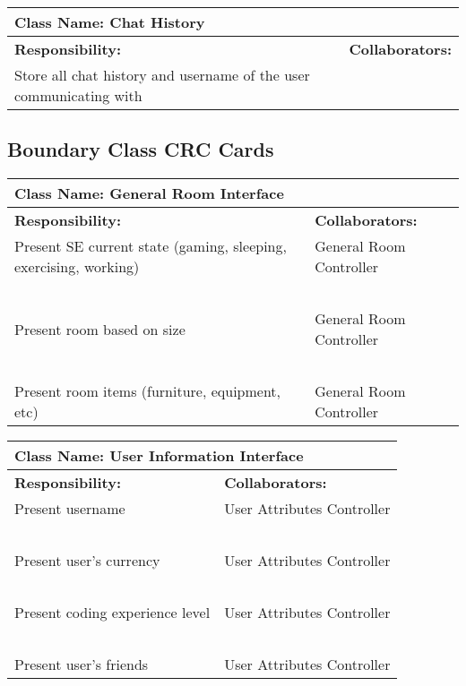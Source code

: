 \documentclass[]{article}
\begin{document}
\begin{table}[H]
    \centering
    \begin{tabular}{|p{7.5cm}|p{7.5cm}|}
        \hline
        \multicolumn{2}{|l|}{\textbf{Class Name:} Chat History}\\
        \hline
        \textbf{Responsibility:} & \textbf{Collaborators:}\\
        \hline
        Store all chat history and username of the user communicating with  & ~\\
        \hline
    \end{tabular}
\end{table}

\subsection{Boundary Class CRC Cards}
\label{sec:boundary_class_CRC_cards}

\begin{table}[H]
    \centering
    \begin{tabular}{|p{7.5cm}|p{7.5cm}|}
        \hline
        \multicolumn{2}{|l|}{\textbf{Class Name:} General Room Interface}\\
        \hline
        \textbf{Responsibility:} & \textbf{Collaborators:}\\
        \hline
        Present SE current state (gaming, sleeping, exercising, working) & General Room Controller\\
        ~ & ~\\
        Present room based on size & General Room Controller\\
        ~ & ~\\
        Present room items (furniture, equipment, etc) & General Room Controller\\
        \hline
    \end{tabular}
\end{table}

\begin{table}[H]
    \centering
    \begin{tabular}{|p{7.5cm}|p{7.5cm}|}
        \hline
        \multicolumn{2}{|l|}{\textbf{Class Name:} User Information Interface}\\
        \hline
        \textbf{Responsibility:} & \textbf{Collaborators:}\\
        \hline
        Present username & User Attributes Controller\\
        ~ & ~\\
        Present user’s currency & User Attributes Controller\\
        ~ & ~\\
        Present coding experience level & User Attributes Controller\\
        ~ & ~\\
        Present user’s friends & User Attributes Controller\\
        \hline
    \end{tabular}
\end{table}
\end{document}
